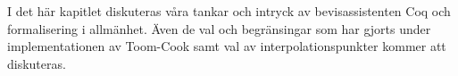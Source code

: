 I det här kapitlet diskuteras våra tankar och intryck av bevisassistenten
Coq och formalisering i allmänhet. Även de val och begränsingar som har
gjorts under implementationen av Toom-Cook samt val av interpolationspunkter
kommer att diskuteras.

